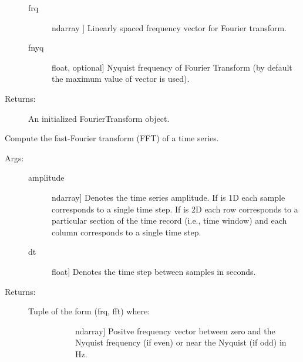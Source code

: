 \documentclass[letterpaper,10pt,english]{sphinxmanual}
\begin{document}
\begin{fulllineitems}
\begin{fulllineitems}
\begin{description}
\begin{description}
\item[{frq}] \leavevmode{[}ndarray {]}
Linearly spaced frequency vector for Fourier transform.

\item[{fnyq}] \leavevmode{[}float, optional{]}
Nyquist frequency of Fourier Transform (by default the
maximum value of  vector is used).

\end{description}

\item[{Returns:}] \leavevmode
An initialized FourierTransform object.

\end{description}

\end{fulllineitems}


\begin{fulllineitems}
\label{\detokenize{index:sigpropy.FourierTransform.fft}}
Compute the fast-Fourier transform (FFT) of a time series.
\begin{description}
\item[{Args:}] \leavevmode\begin{description}
\item[{amplitude}] \leavevmode{[}ndarray{]}
Denotes the time series amplitude. If  is 1D
each sample corresponds to a single time step. If
 is 2D each row corresponds to a particular
section of the time record (i.e., time window) and each
column corresponds to a single time step.

\item[{dt}] \leavevmode{[}float{]}
Denotes the time step between samples in seconds.

\end{description}

\item[{Returns:}] \leavevmode\begin{description}
\item[{Tuple of the form (frq, fft) where:}] \leavevmode\begin{description}
\item[{}] \leavevmode{[}ndarray{]}
Positve frequency vector between zero and the
Nyquist frequency (if even) or near the Nyquist
(if odd) in Hz.


\end{description}
\end{description}
\end{description}
\end{fulllineitems}
\end{fulllineitems}
\end{document}
